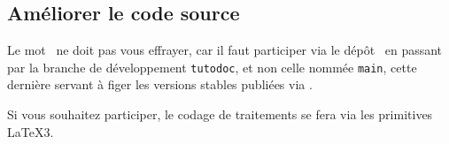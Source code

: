 \documentclass[10pt, a4paper]{../main/main}
\begin{document}

\subsection{Améliorer le code source}

Le mot \git\ ne doit pas vous effrayer, car il faut participer via le dépôt \thisrepo\ en passant par la branche de développement \verb#tutodoc#, et non celle nommée \verb#main#, cette dernière servant à figer les versions stables publiées via \ctan.


\begin{tdocimp}
	Si vous souhaitez participer, le codage de traitements  se fera via les primitives \LaTeX3.
\end{tdocimp}
\end{document}
